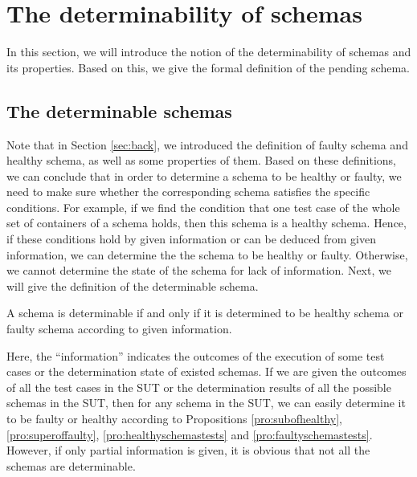 \section{The determinability of schemas}\label{sec:pending}
In this section, we will introduce the notion of the determinability of schemas and its properties. Based on this, we give the formal definition of the pending schema.



\subsection{The determinable schemas}\label{sec:pending:determinable}
Note that in Section \ref{sec:back}, we introduced the definition of faulty schema and healthy schema, as well as some properties of them. Based on these definitions, we can conclude that in order to determine a schema to be healthy or faulty, we need to make sure whether the corresponding schema satisfies the specific conditions. For example, if we find the condition that one test case of the whole set of containers of a schema holds, then this schema is a healthy schema. Hence, if these conditions hold by given information or can be deduced from given information, we can determine the the schema to be healthy or faulty. Otherwise, we cannot determine the state of the schema for lack of information. Next, we will give the definition of the determinable schema.


\begin{definition}\label{de:deteminable}
A schema is determinable if and only if it is determined to be healthy schema or faulty schema according to given information.
\end{definition}

Here, the ``information'' indicates the outcomes of the execution of some test cases or the determination state of existed schemas. If we are given the outcomes of all the test cases in the SUT or the determination results of all the possible schemas in the SUT, then for any schema in the SUT, we can easily determine it to be faulty or healthy according to Propositions \ref{pro:subofhealthy}, \ref{pro:superoffaulty}, \ref{pro:healthyschemastests} and \ref{pro:faultyschemastests}. However, if only partial information is given, it is obvious that not all the schemas are determinable.

